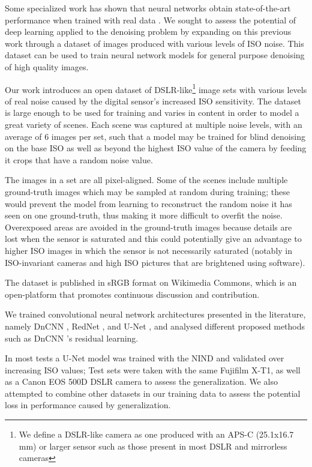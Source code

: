 Some specialized work has shown that neural networks obtain state-of-the-art performance when trained with real data \cite{learningtoseeinthedark}\cite{microscopynoise}. We sought to assess the potential of deep learning applied to the denoising problem by expanding on this previous work through a dataset of images produced with various levels of ISO noise. This dataset can be used to train neural network models for general purpose denoising of high quality images.

Our work introduces an open dataset of DSLR-like\footnote{We define a DSLR-like camera as one produced with an APS-C (25.1x16.7 mm) or larger sensor such as those present in most DSLR and mirrorless cameras} image sets with various levels of real noise caused by the digital sensor's increased ISO sensitivity. The dataset is large enough to be used for training and varies in content in order to model a great variety of scenes. Each scene was captured at multiple noise levels, with an average of 6 images per set, such that a model may be trained for blind denoising on the base ISO as well as beyond the highest ISO value of the camera by feeding it crops that have a random noise value.

The images in a set are all pixel-aligned. Some of the scenes include multiple ground-truth images which may be sampled at random during training; these would prevent the model from learning to reconstruct the random noise it has seen on one ground-truth, thus making it more difficult to overfit the noise. Overexposed areas are avoided in the ground-truth images because details are lost when the sensor is saturated and this could potentially give an advantage to higher ISO images in which the sensor is not necessarily saturated (notably in ISO-invariant cameras and high ISO pictures that are brightened using software).

The dataset is published in sRGB format on Wikimedia Commons, which is an open-platform that promotes continuous discussion and contribution.

We trained convolutional neural network architectures presented in the literature, namely DnCNN \cite{dncnn}, RedNet \cite{rednet}, and U-Net \cite{unet}, and analysed different proposed methods such as DnCNN \cite{dncnn}'s residual learning. 

In most tests a U-Net model was trained with the \ac{NIND} and validated over increasing ISO values; Test sets were taken with the same Fujifilm X-T1, as well as a Canon EOS 500D DSLR camera to assess the generalization. We also attempted to combine other datasets in our training data to assess the potential loss in performance caused by generalization. %



